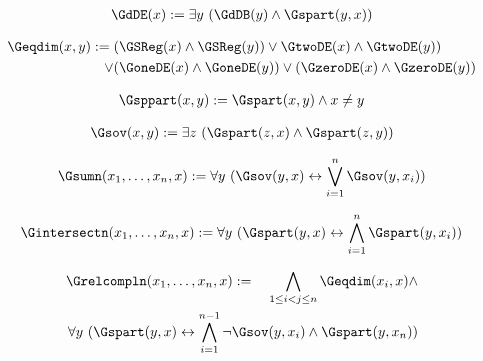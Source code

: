\begin{erin}
    \begin{align*}
        \GdDE(x) := \exists y\ (\GdDB(y) \wedge \Gspart(y, x))
    \end{align*}
\end{erin}

\begin{erin}
    \begin{align*}
        \Geqdim(x,y) := (&\GSReg(x) \wedge \GSReg(y)) \vee \GtwoDE(x) \wedge \GtwoDE(y))\\ \vee (&\GoneDE(x) \wedge \GoneDE(y)) \vee (\GzeroDE(x) \wedge \GzeroDE(y))
    \end{align*}
\end{erin}

\begin{erin}
    \begin{align*}
        \Gsppart(x, y) := \Gspart(x, y) \land  x \neq y
    \end{align*}
\end{erin}

\begin{erin}
    \begin{align*}
        \Gsov(x, y) := \exists z\  (\Gspart(z, x) \wedge \Gspart(z, y))
    \end{align*}
\end{erin}

\begin{erin}
    \begin{align*}
        \Gsumn(x_{1},\ldots,x_{n},x) := \forall y\ (\Gsov(y,x) \leftrightarrow \bigvee^{n}_{i=1} \Gsov(y,x_{i}))
    \end{align*}
\end{erin}

\begin{erin}
    \begin{align*}
        \Gintersectn(x_{1},\ldots,x_{n},x)  := \forall y\ (\Gspart(y,x) \leftrightarrow \bigwedge^{n}_{i=1} \Gspart(y,x_{i}))
    \end{align*}
\end{erin}

\begin{erin}
    \begin{align*}
        \Grelcompln(x_{1},\ldots,x_{n},x) := \hspace*{1em}\bigwedge_{1\leq i < j \leq n} \Geqdim(x_i, x) \wedge\\
        \forall y\ (\Gspart(y,x)
        \leftrightarrow \bigwedge^{n-1}_{i=1} \neg\Gsov(y,x_{i}) \wedge \Gspart(y, x_{n}))
    \end{align*}
\end{erin}


